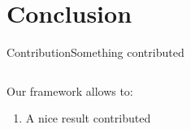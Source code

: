 \section{Conclusion}

\begin{myframe}{Contribution}{Something contributed}
  \vspace{-1.2cm}
  \begin{columns}[t]
  \begin{column}[t]{.75\linewidth}
  \begin{exampleblock}{Our framework allows to:} \setlength{\leftmargini}{15pt}
  {\renewcommand{\baselinestretch}{.7}
  \begin{enumerate} \itemsep1.6ex \footnotesize
    \item A nice result contributed
  \end{enumerate}}
  \end{exampleblock}
  \end{column}
  \end{columns}
\end{myframe}
